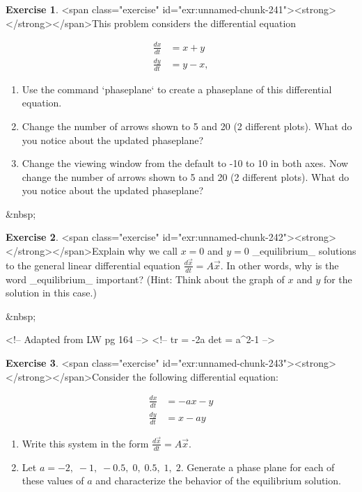 \documentclass[
]{book}
\theoremstyle{definition}
\theoremstyle{definition}
\theoremstyle{definition}
\newtheorem{exercise}{Exercise}[chapter]
\theoremstyle{remark}
\begin{document}
\begin{exercise}
<span class="exercise" id="exr:unnamed-chunk-241"><strong>\label{exr:unnamed-chunk-241} </strong></span>This problem considers the differential equation 

\begin{equation}
\begin{split}
\frac{dx}{dt} &= x+y \\ 
\frac{dy}{dt} &= y-x,
\end{split}
\end{equation}

\begin{enumerate}[label=\alph*.]
\item Use the command `phaseplane` to create a phaseplane of this differential equation.
\item Change the number of arrows shown to 5 and 20 (2 different plots).  What do you notice about the updated phaseplane?
\item Change the viewing window from the default to -10 to 10 in both axes.  Now change the number of arrows shown to 5 and 20 (2 different plots).  What do you notice about the updated phaseplane?
\end{enumerate}
\end{exercise}

&nbsp;



\begin{exercise}
<span class="exercise" id="exr:unnamed-chunk-242"><strong>\label{exr:unnamed-chunk-242} </strong></span>Explain why we call $x=0$ and $y=0$ _equilibrium_ solutions to the general linear differential equation $\displaystyle \frac{ d \vec{x} }{dt} = A \vec{x}$.  In other words, why is the word _equilibrium_ important?  (Hint: Think about the graph of $x$ and $y$ for the solution in this case.)
\end{exercise}


&nbsp;



<!-- Adapted from LW pg 164 -->
<!-- tr = -2a det = a^2-1 -->
\begin{exercise}
<span class="exercise" id="exr:unnamed-chunk-243"><strong>\label{exr:unnamed-chunk-243} </strong></span>Consider the following differential equation:
  
\begin{equation}
\begin{split}
\frac{dx}{dt} &= -ax-y \\ 
\frac{dy}{dt} &= x-ay
\end{split}
\end{equation}

\begin{enumerate}[label=\alph*.]
\item Write this system in the form $\displaystyle \frac{d\vec{x}}{dt}=A \vec{x}$.
\item Let $a= -2, \; -1, \; -0.5, \; 0, \; 0.5, \; 1, \; 2$.  Generate a phase plane for each of these values of $a$ and characterize the behavior of the equilibrium solution.
\end{enumerate}
\end{exercise}
\end{document}
